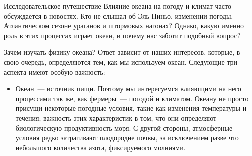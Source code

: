 
\begin{chapter}{Исследовательское путешествие}\label{chap:1}
Влияние океана на погоду и климат часто обсуждается в новостях. Кто не слышал 
об Эль-Ниньо, изменении погоды, Атлантическом сезоне ураганов и штормовых 
нагонах? Однако, какую именно роль в этих процессах играет океан, и почему 
нас заботит подобный вопрос?
%

\begin{section}{Зачем изучать физику океана?}
Ответ зависит от наших интересов, которые, в свою очередь, определяются тем,
как мы используем океан. Следующие три аспекта имеют особую важность:
%

\begin{itemize}
\item 
Океан~--- источник пищи. Поэтому мы интересуемся влияющими на него процессами 
так же, как фермеры~--- погодой и климатом. Океану не просто присущи 
некоторые погодные условия, такие как изменения температуры и течения; 
важность этих характеристик в том, что они определяют биологическую 
продуктивность моря. С другой стороны, атмосферные условия редко затрагивают 
плодородие почвы, за исключением разве что небольшого количества азота, 
фиксируемого молниями.
%


\end{itemize}
\end{section}
\end{chapter}
